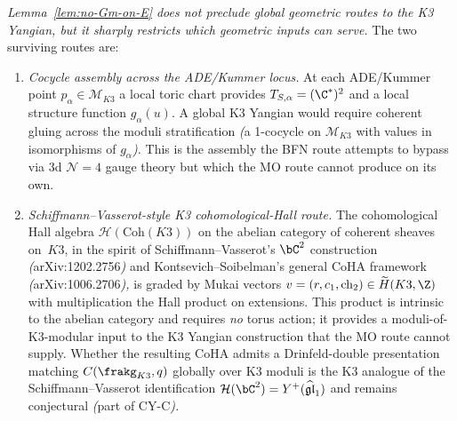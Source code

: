 \begin{remark}
\label{rem:k3-fibration-rescue}
\textit{Lemma~\ref{lem:no-Gm-on-E} does not preclude global
geometric routes to the K3 Yangian, but it sharply restricts
which geometric inputs can serve.} The two surviving routes are:
\begin{enumerate}[label=\textup{(\Roman*)}]
 \item \emph{Cocycle assembly across the ADE/Kummer locus.}
 At each ADE/Kummer point $p_\alpha \in \mathcal{M}_{K3}$ a
 local toric chart provides $T_{S, \alpha} = (\C^*)^2$ and a
 local structure function $g_\alpha(u)$. A global K3 Yangian
 would require coherent gluing across the moduli stratification
 \emph{(}a 1-cocycle on $\mathcal{M}_{K3}$ with values in
 isomorphisms of $g_\alpha$\emph{).} This is the assembly the
 BFN route attempts to bypass via 3d $\mathcal{N} = 4$ gauge
 theory but which the MO route cannot produce on its own.
 \item \emph{Schiffmann--Vasserot-style K3 cohomological-Hall route.}
 The cohomological Hall algebra
 $\mathcal{H}(\mathrm{Coh}(K3))$ on the abelian category of
 coherent sheaves on~$K3$, in the spirit of Schiffmann--Vasserot's
 $\bC^2$ construction \emph{(}arXiv:1202.2756\emph{)} and
 Kontsevich--Soibelman's general CoHA framework
 \emph{(}arXiv:1006.2706\emph{),} is graded by Mukai vectors
 $v = (r, c_1, \mathrm{ch}_2) \in \widetilde{H}(K3, \Z)$ with
 multiplication the Hall product on extensions. This product is
 intrinsic to the abelian category and requires \emph{no} torus
 action; it provides a moduli-of-K3-modular input to the K3
 Yangian construction that the MO route cannot supply. Whether the
 resulting CoHA admits a Drinfeld-double presentation matching
 $C(\frakg_{K3}, q)$ globally over K3 moduli is the K3 analogue of
 the Schiffmann--Vasserot identification
$\mathcal{H}(\bC^2) = Y^+(\widehat{\mathfrak{gl}}_1)$ and remains
conjectural \emph{(}part of CY-C\emph{).}
\end{enumerate}
\end{remark}

